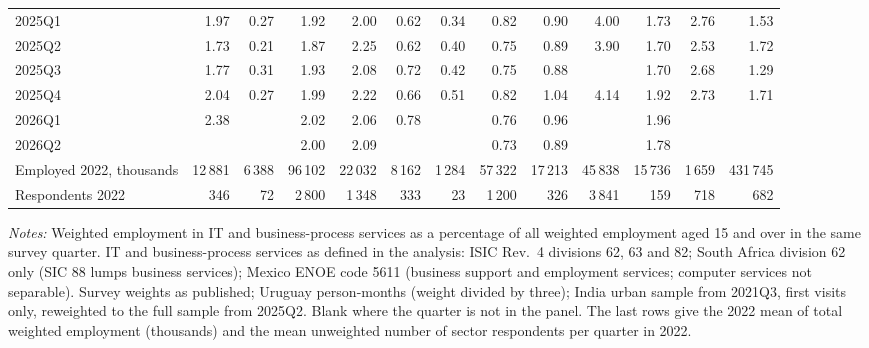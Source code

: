 \begin{table}
\begin{threeparttable}
\begin{tabular}{lrrrrrrrrrrrr}
2025Q1 & 1.97 & 0.27 & 1.92 & 2.00 & 0.62 & 0.34 & 0.82 & 0.90 & 4.00 & 1.73 & 2.76 & 1.53 \\
2025Q2 & 1.73 & 0.21 & 1.87 & 2.25 & 0.62 & 0.40 & 0.75 & 0.89 & 3.90 & 1.70 & 2.53 & 1.72 \\
2025Q3 & 1.77 & 0.31 & 1.93 & 2.08 & 0.72 & 0.42 & 0.75 & 0.88 &  & 1.70 & 2.68 & 1.29 \\
2025Q4 & 2.04 & 0.27 & 1.99 & 2.22 & 0.66 & 0.51 & 0.82 & 1.04 & 4.14 & 1.92 & 2.73 & 1.71 \\
2026Q1 & 2.38 &  & 2.02 & 2.06 & 0.78 &  & 0.76 & 0.96 &  & 1.96 &  &  \\
2026Q2 &  &  & 2.00 & 2.09 &  &  & 0.73 & 0.89 &  & 1.78 &  &  \\
\midrule
Employed 2022, thousands & 12\,881 & 6\,388 & 96\,102 & 22\,032 & 8\,162 & 1\,284 & 57\,322 & 17\,213 & 45\,838 & 15\,736 & 1\,659 & 431\,745 \\
Respondents 2022 & 346 & 72 & 2\,800 & 1\,348 & 333 & 23 & 1\,200 & 326 & 3\,841 & 159 & 718 & 682 \\
\bottomrule
\end{tabular}
\begin{tablenotes}[flushleft]
\footnotesize
\item \textit{Notes:} Weighted employment in IT and business-process services as a percentage of all weighted employment aged 15 and over in the same survey quarter. IT and business-process services as defined in the analysis: ISIC Rev.\ 4 divisions 62, 63 and 82; South Africa division 62 only (SIC 88 lumps business services); Mexico ENOE code 5611 (business support and employment services; computer services not separable). Survey weights as published; Uruguay person-months (weight divided by three); India urban sample from 2021Q3, first visits only, reweighted to the full sample from 2025Q2. Blank where the quarter is not in the panel. The last rows give the 2022 mean of total weighted employment (thousands) and the mean unweighted number of sector respondents per quarter in 2022.
\end{tablenotes}
\end{threeparttable}
\end{table}
